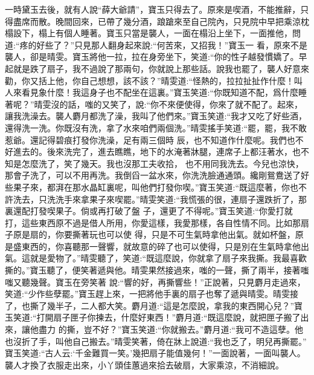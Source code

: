 \begin{parag}
    一時黛玉去後，就有人說“薛大爺請”，寶玉只得去了。原來是喫酒，不能推辭，只得盡席而散。晚間回來，已帶了幾分酒，踉蹌來至自己院內，只見院中早把乘涼枕榻設下，榻上有個人睡著。寶玉只當是襲人，一面在榻沿上坐下，一面推他，問道:“疼的好些了？”只見那人翻身起來說:“何苦來，又招我！”寶玉一 看，原來不是襲人，卻是晴雯。寶玉將他一拉，拉在身旁坐下，笑道:“你的性子越發慣嬌了。早起就是跌了扇子，我不過說了那兩句，你就說上那些話。說我也罷了，襲人好意來勸，你又括上他，你自己想想，該不該？”晴雯道:“怪熱的，拉拉扯扯作什麼！叫人來看見象什麼！我這身子也不配坐在這裏。”寶玉笑道:“你既知道不配，爲什麼睡著呢？”晴雯沒的話，嗤的又笑了，說:“你不來便使得，你來了就不配了。起來，讓我洗澡去。襲人麝月都洗了澡，我叫了他們來。”寶玉笑道:“我才又吃了好些酒，還得洗一洗。你既沒有洗，拿了水來咱們兩個洗。”晴雯搖手笑道:“罷，罷，我不敢惹爺。還記得碧痕打發你洗澡，足有兩三個時 辰，也不知道作什麼呢。我們也不好進去的。後來洗完了，進去瞧瞧，地下的水淹著牀腿，連席子上都汪著水，也不知是怎麼洗了，笑了幾天。我也沒那工夫收拾， 也不用同我洗去。今兒也涼快，那會子洗了，可以不用再洗。我倒舀一盆水來，你洗洗臉通通頭。纔剛鴛鴦送了好些果子來，都湃在那水晶缸裏呢，叫他們打發你喫。”寶玉笑道:“既這麼著，你也不許洗去，只洗洗手來拿果子來喫罷。”晴雯笑道:“我慌張的很，連扇子還跌折了，那裏還配打發喫果子。倘或再打破了盤 子，還更了不得呢。”寶玉笑道:“你愛打就打，這些東西原不過是借人所用，你愛這樣，我愛那樣，各自性情不同。比如那扇子原是扇的，你要撕著玩也可以使 得，只是不可生氣時拿他出氣。就如杯盤，原是盛東西的，你喜聽那一聲響，就故意的碎了也可以使得，只是別在生氣時拿他出氣。這就是愛物了。”晴雯聽了，笑道:“既這麼說，你就拿了扇子來我撕。我最喜歡撕的。”寶玉聽了，便笑著遞與他。晴雯果然接過來，嗤的一聲，撕了兩半，接著嗤嗤又聽幾聲。寶玉在旁笑著 說:“響的好，再撕響些！”正說著，只見麝月走過來，笑道:“少作些孽罷。”寶玉趕上來，一把將他手裏的扇子也奪了遞與晴雯。晴雯接了，也撕了幾半子，二人都大笑。麝月道:“這是怎麼說，拿我的東西開心兒？”寶玉笑道:“打開扇子匣子你揀去，什麼好東西！”麝月道:“既這麼說，就把匣子搬了出來，讓他盡力 的撕，豈不好？”寶玉笑道:“你就搬去。”麝月道:“我可不造這孽。他也沒折了手，叫他自己搬去。”晴雯笑著，倚在牀上說道:“我也乏了，明兒再撕罷。” 寶玉笑道:“古人云:‘千金難買一笑。’幾把扇子能值幾何！”一面說著，一面叫襲人。襲人才換了衣服走出來，小丫頭佳蕙過來拾去破扇，大家乘涼，不消細說。
\end{parag}


